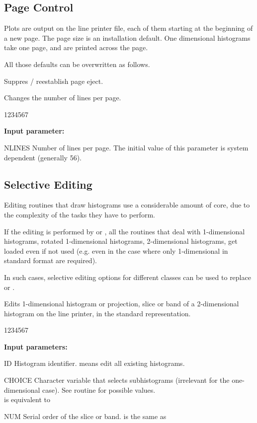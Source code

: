 \subsection{Page Control}
\label{HPAGECON}

Plots are output
on the line printer file, each of them starting at the beginning
of a new page. The page size is an installation default. One dimensional
histograms take one page, and are printed across the page.
 
All those defaults can be overwritten as follows.
 
 
\Action Suppres / reestablish page eject.
 
 
\Action Changes the number of lines per page.
 
\begin{DLttc}{1234567}
\item[{\rm\bf Input parameter:}]
\item[NLINES] Number of lines per page. The initial value of
this parameter is system dependent (generally 56).
\end{DLttc}
 
\subsection{Selective Editing}
\label{HSELEDIT}

Editing routines that draw histograms use a
considerable amount of core, due to the complexity of the tasks they
have to perform.
 
If the editing is performed by  or ,
all the routines that deal with 1-dimensional histograms, rotated
1-dimensional histograms, 2-dimensional histograms,
get loaded even if not
used (e.g. even in the case where only 1-dimensional
in standard format are required).
 
In such cases, selective editing options for different classes
can be used to replace  or .
 
 
\Action
Edits 1-dimensional histogram or projection, slice or band of a
2-dimensional histogram on the line printer, in the standard representation.
 
\begin{DLttc}{1234567}
\item[{\rm\bf Input parameters:}]
\item[ID] Histogram identifier.  means edit all existing histograms.
\item[CHOICE] Character variable that selects subhistograms
(irrelevant for the one-dimensional case).
See routine  for possible values.\\
 is equivalent to 
\item[NUM] Serial order of the slice or band.
 is the same as 
\end{DLttc}
 
